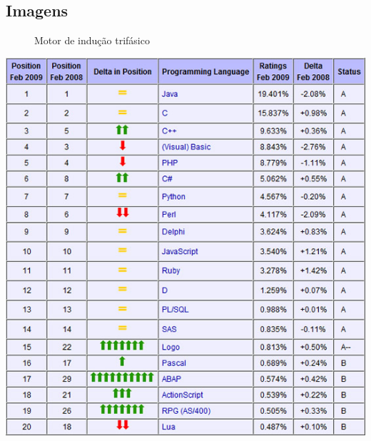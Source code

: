 \lipsum[1-1]


\subsection{Imagens}


 \begin{figure}[!htpb]
 \centering
 	\caption{Motor de indução trifásico}
 	\label{fig:Motores}
 \end{figure}

\begin{quadro}[!htpb]
 \centering
	\caption{Ranking de linguagens de programação - Fev/2009}
	\label{fig:ranking}
 	\includegraphics[width=\textwidth]{figuras/ranking}
\end{quadro}

